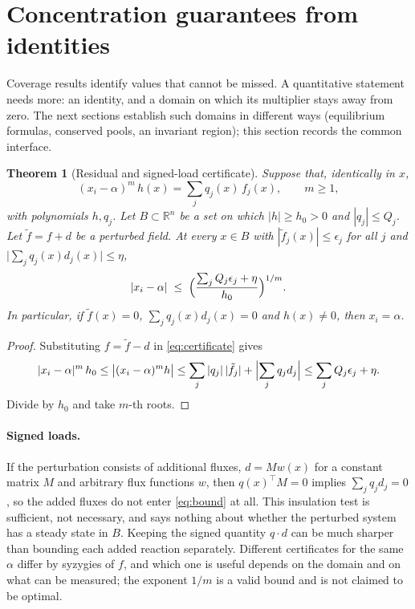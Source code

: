 \documentclass[11pt,a4paper]{article}
\theoremstyle{plain}
\newtheorem{theorem}{Theorem}[section]
\theoremstyle{definition}
\theoremstyle{remark}
\newcommand{\R}{\mathbb{R}}
\begin{document}
\section{Concentration guarantees from identities}\label{sec:bounds}

Coverage results identify values that cannot be missed. A quantitative statement needs more: an identity, and a domain on which its multiplier stays away from zero. The next sections establish such domains in different ways (equilibrium formulas, conserved pools, an invariant region); this section records the common interface.

\begin{theorem}[Residual and signed-load certificate]\label{thm:bound}
Suppose that, identically in $x$,
\begin{equation}\label{eq:certificate}
  (x_i-\alpha)^m\,h(x)=\sum_jq_j(x)\,f_j(x),\qquad m\ge1,
\end{equation}
with polynomials $h,q_j$. Let $B\subset\R^n$ be a set on which $|h|\ge h_0>0$ and $|q_j|\le Q_j$. Let $\tilde f=f+d$ be a perturbed field. At every $x\in B$ with $|\tilde f_j(x)|\le\epsilon_j$ for all $j$ and $\bigl|\sum_jq_j(x)d_j(x)\bigr|\le\eta$,
\begin{equation}\label{eq:bound}
  |x_i-\alpha|\;\le\;\Bigl(\frac{\sum_jQ_j\epsilon_j+\eta}{h_0}\Bigr)^{1/m}.
\end{equation}
In particular, if $\tilde f(x)=0$, $\sum_jq_j(x)d_j(x)=0$ and $h(x)\neq0$, then $x_i=\alpha$.
\end{theorem}
\begin{proof}
Substituting $f=\tilde f-d$ in \eqref{eq:certificate} gives
\[
  |x_i-\alpha|^m\,h_0\le\bigl|(x_i-\alpha)^mh\bigr|\le\sum_j|q_j|\,|\tilde f_j|+\Bigl|\sum_jq_jd_j\Bigr|\le\sum_jQ_j\epsilon_j+\eta .
\]
Divide by $h_0$ and take $m$-th roots.
\end{proof}

\paragraph{Signed loads.}
If the perturbation consists of additional fluxes, $d=Mw(x)$ for a constant matrix $M$ and arbitrary flux functions $w$, then $q(x)^{\!\top}M=0$ implies $\sum_jq_jd_j=0$, so the added fluxes do not enter \eqref{eq:bound} at all. This insulation test is sufficient, not necessary, and says nothing about whether the perturbed system has a steady state in $B$. Keeping the signed quantity $q\cdot d$ can be much sharper than bounding each added reaction separately. Different certificates for the same $\alpha$ differ by syzygies of $f$, and which one is useful depends on the domain and on what can be measured; the exponent $1/m$ is a valid bound and is not claimed to be optimal.
\end{document}

